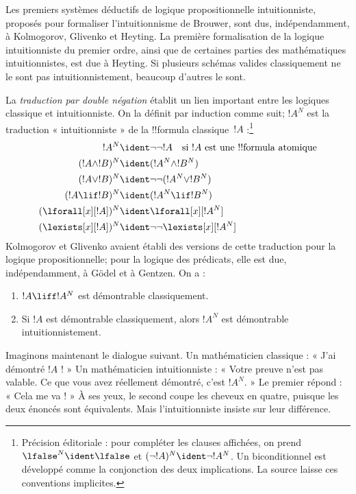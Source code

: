 \documentclass[../../../include/open-logic-section]{subfiles}
\begin{document}
Les premiers systèmes déductifs de logique propositionnelle
intuitionniste, proposés pour formaliser l'intuitionnisme de Brouwer,
sont dus, indépendamment, à Kolmogorov, Glivenko et Heyting.
La première formalisation de la logique intuitionniste du premier
ordre, ainsi que de certaines parties des mathématiques
intuitionnistes, est due à Heyting. Si plusieurs schémas valides
classiquement ne le sont pas intuitionnistement, beaucoup d'autres
le sont.

La \emph{traduction par double négation} établit un lien important
entre les logiques classique et intuitionniste. On la définit par
induction comme suit; $!A^N$ est la traduction « intuitionniste »
de la !!{formula} classique~$!A$ :\footnote{Précision éditoriale : pour compléter les clauses affichées, on prend $\lfalse^N\ident\lfalse$ et $(\lnot !A)^N\ident\lnot !A^N$. Un biconditionnel est développé comme la conjonction des deux implications. La source laisse ces conventions implicites.}
\begin{align*}
!A^N & \ident \lnot\lnot !A \quad \text{si $!A$ est une !!{formula} atomique} \\
(!A \land !B)^N & \ident (!A^N \land !B^N) \\
(!A \lor !B)^N & \ident  \lnot\lnot (!A^N \lor !B^N) \\
(!A \lif !B)^N & \ident (!A^N \lif !B^N) \\
(\lforall[x][!A])^N & \ident \lforall[x][!A^N] \\
(\lexists[x][!A])^N & \ident \lnot\lnot\lexists[x][!A^N]
\end{align*}
Kolmogorov et Glivenko avaient établi des versions de cette
traduction pour la logique propositionnelle; pour la logique des
prédicats, elle est due, indépendamment, à G\"odel et à Gentzen.
On a :

\begin{thm}
\begin{enumerate}
\item $!A \liff !A^N$ est démontrable classiquement.
\item Si $!A$ est démontrable classiquement, alors $!A^N$ est
  démontrable intuitionnistement.
\end{enumerate}
\end{thm}

Imaginons maintenant le dialogue suivant. Un mathématicien classique :
« J'ai démontré $!A$ ! » Un mathématicien intuitionniste :
« Votre preuve n'est pas valable. Ce que vous avez réellement
démontré, c'est $!A^N$. » Le premier répond : « Cela me va ! »
À ses yeux, le second coupe les cheveux en quatre, puisque les deux
énoncés sont équivalents. Mais l'intuitionniste insiste sur leur
différence.
\end{document}
